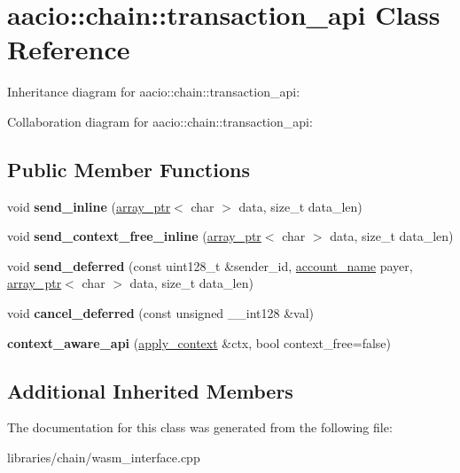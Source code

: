 \hypertarget{classaacio_1_1chain_1_1transaction__api}{}\section{aacio\+:\+:chain\+:\+:transaction\+\_\+api Class Reference}
\label{classaacio_1_1chain_1_1transaction__api}


Inheritance diagram for aacio\+:\+:chain\+:\+:transaction\+\_\+api\+:


Collaboration diagram for aacio\+:\+:chain\+:\+:transaction\+\_\+api\+:
\subsection*{Public Member Functions}
\begin{DoxyCompactItemize}
\item 
\mbox{\label{classaacio_1_1chain_1_1transaction__api_a42ac049226351cf64f5bdadd206aa28f}} 
void {\bfseries send\+\_\+inline} (\mbox{\hyperlink{structaacio_1_1chain_1_1array__ptr}{array\+\_\+ptr}}$<$ char $>$ data, size\+\_\+t data\+\_\+len)
\item 
\mbox{\label{classaacio_1_1chain_1_1transaction__api_adc1cdbee29be9d978a9401d2abc4a8b8}} 
void {\bfseries send\+\_\+context\+\_\+free\+\_\+inline} (\mbox{\hyperlink{structaacio_1_1chain_1_1array__ptr}{array\+\_\+ptr}}$<$ char $>$ data, size\+\_\+t data\+\_\+len)
\item 
\mbox{\label{classaacio_1_1chain_1_1transaction__api_a650e5a4684e181b044855ebf1db7d6c5}} 
void {\bfseries send\+\_\+deferred} (const uint128\+\_\+t \&sender\+\_\+id, \mbox{\hyperlink{structaacio_1_1chain_1_1name}{account\+\_\+name}} payer, \mbox{\hyperlink{structaacio_1_1chain_1_1array__ptr}{array\+\_\+ptr}}$<$ char $>$ data, size\+\_\+t data\+\_\+len)
\item 
\mbox{\label{classaacio_1_1chain_1_1transaction__api_a58d8fa704b91849024ce425805cc00fd}} 
void {\bfseries cancel\+\_\+deferred} (const unsigned \+\_\+\+\_\+int128 \&val)
\item 
\mbox{\label{classaacio_1_1chain_1_1transaction__api_ad2711b0a72fe3f1b0b1512c97e16d285}} 
{\bfseries context\+\_\+aware\+\_\+api} (\mbox{\hyperlink{classaacio_1_1chain_1_1apply__context}{apply\+\_\+context}} \&ctx, bool context\+\_\+free=false)
\end{DoxyCompactItemize}
\subsection*{Additional Inherited Members}


The documentation for this class was generated from the following file\+:\begin{DoxyCompactItemize}
\item 
libraries/chain/wasm\+\_\+interface.\+cpp\end{DoxyCompactItemize}
